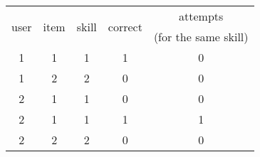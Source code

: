 \small
\begin{tabular}{ccccc}
\toprule
 \multirow{2}{*}{user} &  \multirow{2}{*}{item} &  \multirow{2}{*}{skill} &  \multirow{2}{*}{correct} &  attempts\\
 & & & & (for the same skill) \\
\midrule
    1 &     1 &      1 &        1 &           0 \\
    1 &     2 &      2 &        0 &           0 \\
    2 &     1 &      1 &        0 &           0 \\
    2 &     1 &      1 &        1 &           1 \\
    2 &     2 &      2 &        0 &           0 \\
\bottomrule
\end{tabular}
